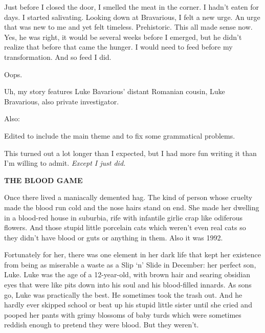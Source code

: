 Just before I closed the door, I smelled the meat in the corner. I
hadn't eaten for days. I started salivating. Looking down at
Bravarious, I felt a new urge. An urge that was new to me and yet
felt timeless. Prehistoric. This all made sense now. Yes, he was
right, it would be several weeks before I emerged, but he
didn't realize that before that came the hunger. I would need
to feed before my transformation. And so feed I did. 

 





Oops.

Uh, my story features Luke Bavarious' distant Romanian cousin, Luke
Bravarious, also private investigator.



Also:

Edited to include the main theme and to fix some grammatical
problems. 
 





This turned out a lot longer than I expected, but I had more fun
writing it than I'm willing to admit. {\em Except I just
did.}



{\bf THE BLOOD GAME}



Once there lived a maniacally demented hag. The kind of person
whose cruelty made the blood run cold and the nose hairs stand on
end. She made her dwelling in a blood-red house in suburbia, rife
with infantile girlie crap like odiferous flowers. And those stupid
little porcelain cats which weren't even real cats so they
didn't have blood or guts or anything in them. Also it was
1992.



Fortunately for her, there was one element in her dark life that
kept her existence from being as miserable a waste as a Slip
`n' Slide in December: her perfect son, Luke. Luke was
the age of a 12-year-old, with brown hair and searing obsidian eyes
that were like pits down into his soul and his blood-filled
innards. As sons go, Luke was practically the best. He sometimes
took the trash out. And he hardly ever skipped school or beat up
his stupid little sister until she cried and pooped her pants with
grimy blossoms of baby turds which were sometimes reddish enough to
pretend they were blood. But they weren't.




